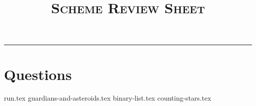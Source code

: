 \documentclass{exam}
\title{\textsc{Scheme Review Sheet}}
\begin{document}
\maketitle
\rule{\textwidth}{0.15em}
\fontsize{12}{15}\selectfont

\section{Questions}
\begin{questions}
{run.tex}
{guardians-and-asteroids.tex}
{binary-list.tex}
{counting-stars.tex}

\end{questions}
\end{document}
